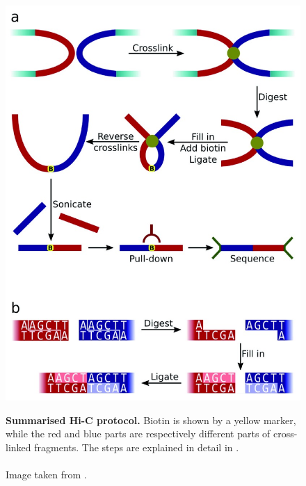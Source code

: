 \begin{figure}[t]
\begin{centering}
    {\includegraphics[scale=4,trim=0 40 0 6, clip]{figures/background/f1000research-4-7903-g0000.jpg}}
    \caption[Summarised Hi-C protocol]
    {\textbf{Summarised Hi-C protocol.}
    Biotin is shown by a yellow marker, while the red and blue parts are
    respectively different parts of cross-linked fragments.
    The steps are explained in detail in .
    \\ \\ Image taken from \cite{wingett2015hicup}.}
    \label{fig:HiC}
\end{centering}
\end{figure}

